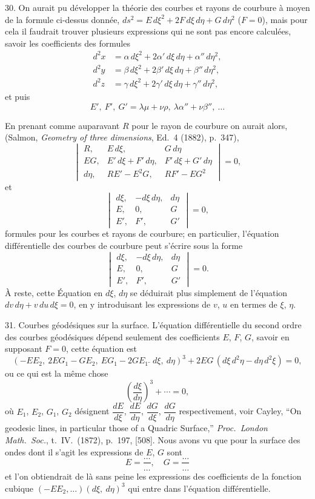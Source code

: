 \documentclass[11pt,a4paper]{article}
\begin{document}
30. On aurait pu d\'evelopper la th\'eorie des courbes et rayons de courbure \`a
moyen de la formule ci-dessus donn\'ee,
$ds^2 = E\,d\xi^2 + 2F\,d\xi\,d\eta + G\,d\eta^2$ ($F=0$),
mais pour cela il faudrait trouver plusieurs expressions qui ne sont pas encore
calcul\'ees, savoir les coefficients des formules
\begin{align*}
d^2x &= \alpha\,d\xi^2 + 2\alpha'\,d\xi\,d\eta + \alpha''\,d\eta^2,\\
d^2y &= \beta\,d\xi^2 + 2\beta'\,d\xi\,d\eta + \beta''\,d\eta^2,\\
d^2z &= \gamma\,d\xi^2 + 2\gamma'\,d\xi\,d\eta + \gamma''\,d\eta^2,
\end{align*}
et puis
\[
E',\ F',\ G' = \lambda\mu + \nu\rho,\ \lambda\alpha'' + \nu\beta'',\ \ldots
\]

En prenant comme auparavant $R$ pour le rayon de courbure on aurait alors,
(Salmon, \textit{Geometry of three dimensions}, Ed.\ 4 (1882), p.\ 347),
\[
\begin{vmatrix}
R, & E\,d\xi, & G\,d\eta \\
EG, & E'\,d\xi + F'\,d\eta, & F'\,d\xi + G'\,d\eta \\
d\eta, & RE' - E^2G, & RF' - EG^2
\end{vmatrix}
= 0,
\]
et
\[
\begin{vmatrix}
d\xi, & -d\xi\,d\eta, & d\eta \\
E, & 0, & G \\
E', & F', & G'
\end{vmatrix}
= 0,
\]
formules pour les courbes et rayons de courbure; en particulier, l'\'equation diff\'erentielle
des courbes de courbure peut s'\'ecrire sous la forme
\[
\begin{vmatrix}
d\xi, & -d\xi\,d\eta, & d\eta \\
E, & 0, & G \\
E', & F', & G'
\end{vmatrix}
= 0.
\]
\`A reste, cette \'Equation en $d\xi$, $d\eta$ se d\'eduirait plus simplement de l'\'equation
$dv\,d\eta + v\,du\,d\xi = 0$, en y introduisant les expressions de $v$, $u$ en termes de $\xi$, $\eta$.

31. Courbes g\'eod\'esiques sur la surface. L'\'equation diff\'erentielle du second ordre
des courbes g\'eod\'esiques d\'epend seulement des coefficients $E$, $F$, $G$, savoir en supposant
$F=0$, cette \'equation est
\[
(-EE_2,\ 2EG_1 - GE_2,\ EG_1 - 2GE_1\,\breve{\,}\,d\xi,\ d\eta)^3
+ 2EG\,(d\xi\,d^2\eta - d\eta\,d^2\xi) = 0,
\]
ou ce qui est la m\^eme chose
\[
\left(\frac{d\xi}{d\eta}\right)^3 + \cdots = 0,
\]
o\`u $E_1$, $E_2$, $G_1$, $G_2$ d\'esignent $\dfrac{dE}{d\xi}$, $\dfrac{dE}{d\eta}$,
$\dfrac{dG}{d\xi}$, $\dfrac{dG}{d\eta}$ respectivement,
voir Cayley, ``On geodesic lines, in particular those of a Quadric Surface,''
\textit{Proc.\ London Math.\ Soc.}, t.\ IV.\ (1872), p.\ 197, [508].
Nous avons vu que pour la surface des ondes dont il s'agit les expressions de $E$, $G$ sont
\[
E = \frac{\ldots}{\ldots}, \quad G = \frac{\ldots}{\ldots}
\]
et l'on obtiendrait de l\`a sans peine les expressions des coefficients de la fonction
cubique $(-EE_2,\ldots)(d\xi,\ d\eta)^3$ qui entre dans l'\'equation diff\'erentielle.
\end{document}
